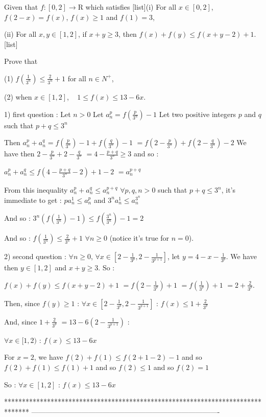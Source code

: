 \begin{solution}
	\begin{tcolorbox}Given that $ f: [0,2] \rightarrow \textrm{R}$ which satisfies
[list](i) For all $ x \in [0,2]$, $ f(2 - x) = f(x)$, $ f(x) \geq 1$ and $ f(1) = 3$,

(ii) For all $ x,y \in [1,2]$, if $ x + y \geq 3$, then $ f(x) + f(y) \leq f(x + y - 2) + 1$.[\/list]

Prove that

(1) $ f \left(\frac {1}{3^n} \right) \leq \frac {2}{3^n} + 1$ for all $ n \in N^ +$,

(2) when $ x \in [1,2]$,      $ \; \; \; 1 \leq f(x) \leq 13 - 6x$.\end{tcolorbox}

1) first question :
Let $ n>0$
Let $ a_n^p=f(\frac{p}{3^n})-1$
Let two positive integers $ p$ and $ q$ such that $ p+q\leq 3^n$ 

Then $ a_n^p+a_n^q=f(\frac{p}{3^n})-1+f(\frac{q}{3^n})-1$ $ =f(2-\frac{p}{3^n})+f(2-\frac{q}{3^n})-2$
We have then $ 2-\frac{p}{3^n}+2-\frac{q}{3^n}$ $ =4-\frac{p+q}{3^n}\geq 3$ and so :

$ a_n^p+a_n^q\leq f(4-\frac{p+q}{3^n}-2)+1-2$ $ =a_n^{p+q}$

From this inequality $ a_n^p+a_n^q\leq a_n^{p+q}$ $ \forall p,q,n>0$ such that $ p+q\leq 3^n$, it's immediate to get : $ pa_n^1\leq a_n^p$ and $ 3^na_n^1\leq a_n^{3^n}$

And so : $ 3^n(f(\frac{1}{3^n})-1)\leq f(\frac{3^n}{3^n})-1=2$

And so : $ f(\frac{1}{3^n})\leq \frac{2}{3^n}+1$ $ \forall n\geq 0$ (notice it's true for $ n=0$).

2) second question :
$ \forall n\geq 0$, $ \forall x\in[2-\frac{1}{3^p},2-\frac{1}{3^{p+1}}]$, let $ y=4-x-\frac{1}{3^p}$. We have then $ y\in[1,2]$ and $ x+y\geq 3$. So :

$ f(x)+f(y)\leq f(x+y-2)+1$ $ =f(2-\frac{1}{3^p})+1$ $ =f(\frac{1}{3^p})+1$ $ =2+\frac{2}{3^p}$.

Then, since $ f(y)\geq 1$ : 
$ \forall x\in[2-\frac{1}{3^p},2-\frac{1}{3^{p+1}}]$ : $ f(x)\leq 1 + \frac{2}{3^p}$

And, since $ 1 + \frac{2}{3^p}$ $ =13 - 6(2-\frac{1}{3^{p+1}})$ :

$ \forall x\in[1,2)$ : $ f(x)\leq 13-6x$

For $ x=2$, we have $ f(2)+f(1)\leq f(2+1-2)-1$ and so $ f(2)+f(1)\leq f(1)+1$ and so $ f(2)\leq 1$ and so $ f(2)=1$

So : $ \forall x\in[1,2]$ : $ f(x)\leq 13-6x$
\end{solution}
*******************************************************************************
-------------------------------------------------------------------------------

